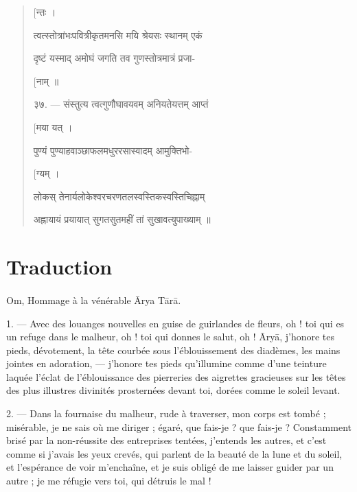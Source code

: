 \documentclass[a4paper, 11pt, oneside, french, landscape, twocolumn]{article}
\begin{document}
\begin{quotation}
\hspace*{55mm}\texthindi{[न्तः ।}

\texthindi{त्वत्स्तोत्रांभःपवित्रीकृतमनसि मयि श्रेयसः स्थानम् एकं}

\texthindi{दृष्टं यस्माद् अमोघं जगति तव गुणस्तोत्रमात्रं प्रजा-}

\hspace*{55mm}\texthindi{[नाम् ॥}

\bigskip

\texthindi{३७}. --- \texthindi{संस्तुत्य त्वत्गुणौघावयवम् अनियतेयत्तम् आप्तं}

\hspace*{55mm}\texthindi{[मया यत् ।}

\texthindi{पुण्यं पुण्याहवाञ्छाफलमधुररसास्वादम् आमुक्तिभो-}

\hspace*{55mm}\texthindi{[ग्यम् ।}

\texthindi{लोकस् तेनार्यलोकेश्वरचरणतलस्वस्तिकस्वस्तिचिह्नाम्}

\texthindi{अह्नायायं प्रयायात् सुगतसुतमहीं तां सुखावत्युपाख्याम् ॥}
\end{quotation}
\clearpage
\section{Traduction}
\paragraph{}
Om, Hommage à la vénérable \={A}rya T\={a}r\={a}.

\bigskip

1. --- Avec des louanges nouvelles en guise de guirlandes de fleurs, oh ! toi qui es un refuge dans le malheur, oh ! toi qui donnes le salut, oh ! \={A}ry\={a}, j'honore tes pieds, dévotement, la tête courbée sous l'éblouissement des diadèmes, les mains jointes en adoration, --- j'honore tes pieds qu'illumine comme d'une teinture laquée l'éclat de l'éblouissance des pierreries des aigrettes gracieuses sur les têtes des plus illustres divinités prosternées devant toi, dorées comme le soleil levant.

2. --- Dans la fournaise du malheur, rude à traverser, mon corps est tombé ; misérable, je ne sais où me diriger ; égaré, que fais-je ? que fais-je ? Constamment brisé par la non-réussite des entreprises tentées, j'entends les autres, et c'est comme si j'avais les yeux crevés, qui parlent de la beauté de la lune et du soleil, et l'espérance de voir m'enchaîne, et je suis obligé de me laisser guider par un autre ; je me réfugie vers toi, qui détruis le mal !
\end{document}
